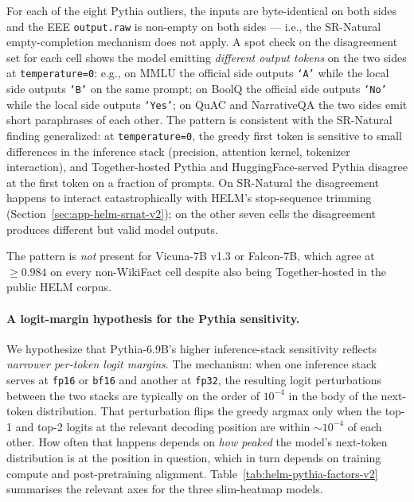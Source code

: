 For each of the eight Pythia outliers, the inputs are byte-identical
  on both sides and the EEE \texttt{output.raw} is non-empty on both
  sides — i.e., the SR-Natural empty-completion mechanism does not
  apply.
A spot check on the disagreement set for each cell shows the model
  emitting \emph{different output tokens} on the two sides at
  \texttt{temperature=0}: e.g., on MMLU the official side outputs
  \texttt{`\textvisiblespace A'} while the local side outputs
  \texttt{`\textvisiblespace B'} on the same prompt; on BoolQ the
  official side outputs \texttt{`\textvisiblespace No'} while the
  local side outputs \texttt{`\textvisiblespace Yes'}; on QuAC and
  NarrativeQA the two sides emit short paraphrases of each other.
The pattern is consistent with the SR-Natural finding generalized:
  at \texttt{temperature=0}, the greedy first token is sensitive to
  small differences in the inference stack (precision, attention
  kernel, tokenizer interaction), and Together-hosted Pythia and
  HuggingFace-served Pythia disagree at the first token on a fraction
  of prompts.
On SR-Natural the disagreement happens to interact catastrophically
  with HELM's stop-sequence trimming
  (Section~\ref{sec:app-helm-srnat-v2}); on the other seven cells the
  disagreement produces different but valid model outputs.

The pattern is \emph{not} present for Vicuna-7B v1.3 or Falcon-7B,
  which agree at $\geq 0.984$ on every non-WikiFact cell despite also
  being Together-hosted in the public HELM corpus.

\paragraph{A logit-margin hypothesis for the Pythia sensitivity.}
We hypothesize that Pythia-6.9B's higher inference-stack sensitivity
  reflects \emph{narrower per-token logit margins}.
The mechanism: when one inference stack serves at \texttt{fp16} or
  \texttt{bf16} and another at \texttt{fp32}, the resulting logit
  perturbations between the two stacks are typically on the order of
  $10^{-4}$ in the body of the next-token distribution.
That perturbation flips the greedy argmax only when the top-1 and
  top-2 logits at the relevant decoding position are within
  $\sim 10^{-4}$ of each other.
How often that happens depends on \emph{how peaked} the model's
  next-token distribution is at the position in question, which in
  turn depends on training compute and post-pretraining alignment.
Table~\ref{tab:helm-pythia-factors-v2} summarises the relevant
  axes for the three slim-heatmap models.

